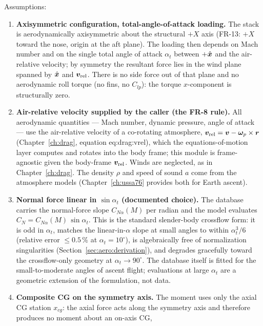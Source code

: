 Assumptions:
\begin{enumerate}
  \item \textbf{Axisymmetric configuration, total-angle-of-attack
    loading.} The stack is aerodynamically axisymmetric about the
    structural $+X$ axis (FR-13: $+X$ toward the nose, origin at the aft
    plane). The loading then depends on Mach number and on the single
    total angle of attack $\alpha_t$ between $+\hat{\bm{x}}$ and the
    air-relative velocity; by symmetry the resultant force lies in the
    wind plane spanned by $\hat{\bm{x}}$ and $\bm{v}_{\mathrm{rel}}$.
    There is no side force out of that plane and no aerodynamic roll
    torque (no fins, no $C_{lp}$): the torque $x$-component is
    structurally zero.
  \item \textbf{Air-relative velocity supplied by the caller (the FR-8
    rule).} All aerodynamic quantities --- Mach number, dynamic pressure,
    angle of attack --- use the air-relative velocity of a co-rotating
    atmosphere, $\bm{v}_{\mathrm{rel}} = \bm{v} - \bm{\omega}_p \times
    \bm{r}$ (Chapter~\ref{ch:drag}, equation eq:drag:vrel), which the
    equations-of-motion layer computes and rotates into the body frame;
    this module is frame-agnostic given the body-frame
    $\bm{v}_{\mathrm{rel}}$. Winds are neglected, as in
    Chapter~\ref{ch:drag}. The density $\rho$ and speed of sound $a$ come
    from the atmosphere models (Chapter~\ref{ch:ussa76} provides both for
    Earth ascent).
  \item \textbf{Normal force linear in $\sin\alpha_t$ (documented
    choice).} The database carries the normal-force slope
    $C_{N\alpha}(M)$ per radian and the model evaluates
    $C_N = C_{N\alpha}(M)\,\sin\alpha_t$. This is the standard
    slender-body crossflow form: it is odd in $\alpha_t$, matches the
    linear-in-$\alpha$ slope at small angles to within
    $\alpha_t^3/6$ (relative error $\le 0.5\,\%$ at
    $\alpha_t = 10^\circ$), is algebraically free of normalization
    singularities (Section~\ref{sec:aero:derivation}), and degrades
    gracefully toward the crossflow-only geometry at
    $\alpha_t \to 90^\circ$. The database itself is fitted for the
    small-to-moderate angles of ascent flight; evaluations at large
    $\alpha_t$ are a geometric extension of the formulation, not data.
  \item \textbf{Composite CG on the symmetry axis.} The moment uses only
    the axial CG station $x_{cg}$: the axial force acts along the
    symmetry axis and therefore produces no moment about an on-axis CG,

\end{enumerate}

